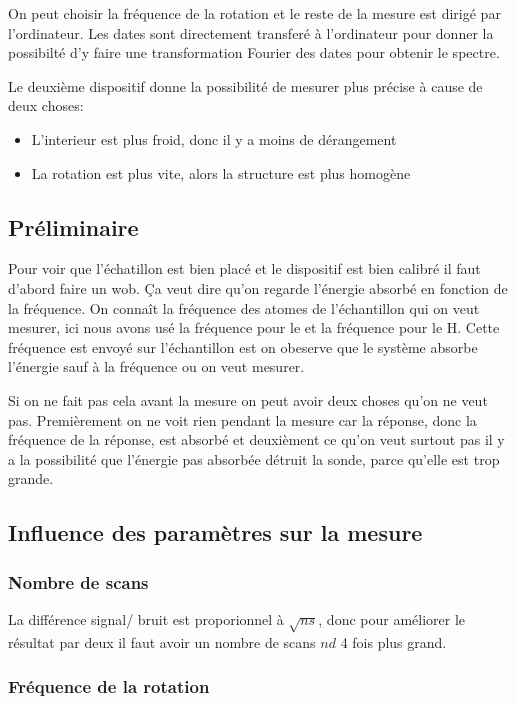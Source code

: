 \documentclass[a4paper,12pt]{scrartcl}
\begin{document}
   On peut choisir la fréquence de la rotation et le reste de la mesure est dirigé par l'ordinateur. Les dates sont directement transferé à l'ordinateur pour donner la possibilté d'y faire une transformation Fourier des dates pour obtenir le spectre.

   Le deuxième dispositif donne la possibilité de mesurer plus précise à cause de deux choses:
   \begin{itemize}
    \item L'interieur est plus froid, donc il y a moins de dérangement
    \item La rotation est plus vite, alors la structure est plus homogène
   \end{itemize}


  \subsection{Préliminaire} 
   Pour voir que l'échatillon est bien placé et le dispositif est bien calibré il faut d'abord faire un \flqq wob\frqq. \c Ca veut dire qu'on regarde l'énergie absorbé en fonction de la fréquence. On connaît la fréquence des atomes de l'échantillon qui on veut mesurer, ici nous avons usé la fréquence pour le  et la fréquence pour le H. Cette fréquence est envoyé sur l'échantillon est on obeserve que le système absorbe l'énergie sauf à la fréquence ou on veut mesurer. 

   Si on ne fait pas cela avant la mesure on peut avoir deux choses qu'on ne veut pas. Premièrement on ne voit rien pendant la mesure car la réponse, donc la fréquence de la réponse, est absorbé et deuxièment ce qu'on veut surtout pas il y a la possibilité que l'énergie pas absorbée détruit la sonde, parce qu'elle est trop grande.

   \subsection{Influence des paramètres sur la mesure}
    \subsubsection{Nombre de scans}
     La différence signal/ bruit est proporionnel à $\sqrt{ns}$, donc pour améliorer le résultat par deux il faut avoir un nombre de scans $nd$ 4 fois plus grand.

    \subsubsection{Fréquence de la rotation}
\end{document}
